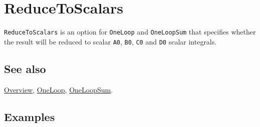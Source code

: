 \documentclass[../FeynCalcManual.tex]{subfiles}
\begin{document}
\hypertarget{reducetoscalars}{
\section{ReduceToScalars}\label{reducetoscalars}}

\texttt{ReduceToScalars} is an option for \texttt{OneLoop} and
\texttt{OneLoopSum} that specifies whether the result will be reduced to
scalar \texttt{A0}, \texttt{B0}, \texttt{C0} and \texttt{D0} scalar
integrals.

\subsection{See also}

\hyperlink{toc}{Overview}, \hyperlink{oneloop}{OneLoop},
\hyperlink{oneloopsum}{OneLoopSum}.

\subsection{Examples}
\end{document}
